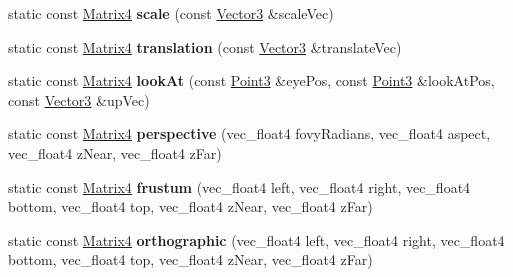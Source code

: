 \begin{DoxyCompactItemize}
\item 
\hypertarget{classVectormath_1_1Soa_1_1Matrix4_aa60cd60f1dbbab97330228d8beafda6a}{static const \hyperlink{classVectormath_1_1Soa_1_1Matrix4}{Matrix4} {\bfseries scale} (const \hyperlink{classVectormath_1_1Soa_1_1Vector3}{Vector3} \&scale\-Vec)}\label{classVectormath_1_1Soa_1_1Matrix4_aa60cd60f1dbbab97330228d8beafda6a}

\item 
\hypertarget{classVectormath_1_1Soa_1_1Matrix4_a202d38acb59aab33de47273cb55c2398}{static const \hyperlink{classVectormath_1_1Soa_1_1Matrix4}{Matrix4} {\bfseries translation} (const \hyperlink{classVectormath_1_1Soa_1_1Vector3}{Vector3} \&translate\-Vec)}\label{classVectormath_1_1Soa_1_1Matrix4_a202d38acb59aab33de47273cb55c2398}

\item 
\hypertarget{classVectormath_1_1Soa_1_1Matrix4_af6413fe51d4d15b8557754617e6e3740}{static const \hyperlink{classVectormath_1_1Soa_1_1Matrix4}{Matrix4} {\bfseries look\-At} (const \hyperlink{classVectormath_1_1Soa_1_1Point3}{Point3} \&eye\-Pos, const \hyperlink{classVectormath_1_1Soa_1_1Point3}{Point3} \&look\-At\-Pos, const \hyperlink{classVectormath_1_1Soa_1_1Vector3}{Vector3} \&up\-Vec)}\label{classVectormath_1_1Soa_1_1Matrix4_af6413fe51d4d15b8557754617e6e3740}

\item 
\hypertarget{classVectormath_1_1Soa_1_1Matrix4_afd60c8e8c24f96b1aca5109dd87477c0}{static const \hyperlink{classVectormath_1_1Soa_1_1Matrix4}{Matrix4} {\bfseries perspective} (vec\-\_\-float4 fovy\-Radians, vec\-\_\-float4 aspect, vec\-\_\-float4 z\-Near, vec\-\_\-float4 z\-Far)}\label{classVectormath_1_1Soa_1_1Matrix4_afd60c8e8c24f96b1aca5109dd87477c0}

\item 
\hypertarget{classVectormath_1_1Soa_1_1Matrix4_a5a8e641c3cb33b5c8f225fa044ab3b1d}{static const \hyperlink{classVectormath_1_1Soa_1_1Matrix4}{Matrix4} {\bfseries frustum} (vec\-\_\-float4 left, vec\-\_\-float4 right, vec\-\_\-float4 bottom, vec\-\_\-float4 top, vec\-\_\-float4 z\-Near, vec\-\_\-float4 z\-Far)}\label{classVectormath_1_1Soa_1_1Matrix4_a5a8e641c3cb33b5c8f225fa044ab3b1d}

\item 
\hypertarget{classVectormath_1_1Soa_1_1Matrix4_a12021ed0ad730869e579a654f2eb1166}{static const \hyperlink{classVectormath_1_1Soa_1_1Matrix4}{Matrix4} {\bfseries orthographic} (vec\-\_\-float4 left, vec\-\_\-float4 right, vec\-\_\-float4 bottom, vec\-\_\-float4 top, vec\-\_\-float4 z\-Near, vec\-\_\-float4 z\-Far)}\label{classVectormath_1_1Soa_1_1Matrix4_a12021ed0ad730869e579a654f2eb1166}


\end{DoxyCompactItemize}

